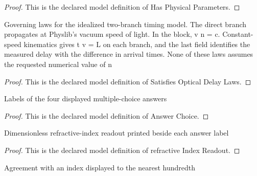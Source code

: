 \begin{proof}
  This is the declared model definition of Has Physical Parameters.
\end{proof}
\begin{definition}
  \label{def:physics:phyx-mini-0092:phyxminiproblems-problemphyxmini0092-satisfiesopticaldelaylaws}
  Governing laws for the idealized two-branch timing model. The direct branch propagates at Physlib's vacuum speed of light. In the block, v n = c. Constant-speed kinematics gives t v = L on each branch, and the last field identifies the measured delay with the difference in arrival times. None of these laws assumes the requested numerical value of n
\end{definition}
\begin{proof}
  This is the declared model definition of Satisfies Optical Delay Laws.
\end{proof}
\begin{definition}
  \label{def:physics:phyx-mini-0092:phyxminiproblems-problemphyxmini0092-answerchoice}
  Labels of the four displayed multiple-choice answers
\end{definition}
\begin{proof}
  This is the declared model definition of Answer Choice.
\end{proof}
\begin{definition}
  \label{def:physics:phyx-mini-0092:phyxminiproblems-problemphyxmini0092-answerchoice-refractiveindexreadout}
  Dimensionless refractive-index readout printed beside each answer label
\end{definition}
\begin{proof}
  This is the declared model definition of refractive Index Readout.
\end{proof}
\begin{definition}
  \label{def:physics:phyx-mini-0092:phyxminiproblems-problemphyxmini0092-matchesanswerchoice}
  Agreement with an index displayed to the nearest hundredth
\end{definition}

